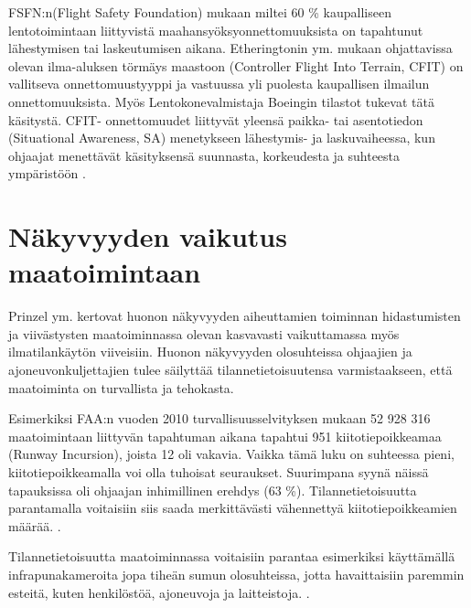 \documentclass[utf8,bachelor,manualbib]{gradu3}
\begin{document}
FSFN:n(Flight Safety Foundation) mukaan miltei 60 \% kaupalliseen lentotoimintaan liittyvistä maahansyöksyonnettomuuksista on tapahtunut lähestymisen tai laskeutumisen aikana. Etheringtonin ym. \citeyearpar{etherington2000} mukaan ohjattavissa olevan ilma-aluksen törmäys maastoon (Controller Flight Into Terrain, CFIT) on vallitseva onnettomuustyyppi ja vastuussa yli puolesta kaupallisen ilmailun onnettomuuksista. Myös Lentokonevalmistaja Boeingin \citeyearpar{boeing1996} tilastot tukevat tätä käsitystä. CFIT- onnettomuudet liittyvät yleensä paikka- tai asentotiedon (Situational Awareness, SA) menetykseen lähestymis- ja laskuvaiheessa, kun ohjaajat menettävät käsityksensä suunnasta, korkeudesta ja suhteesta ympäristöön \cite{schnell2004}.

\section{Näkyvyyden vaikutus maatoimintaan}

Prinzel ym. \citeyearpar{prinzel2013} kertovat huonon näkyvyyden aiheuttamien toiminnan hidastumisten ja viivästysten maatoiminnassa olevan kasvavasti vaikuttamassa myös ilmatilankäytön viiveisiin. Huonon näkyvyyden olosuhteissa ohjaajien ja ajoneuvonkuljettajien tulee säilyttää tilannetietoisuutensa varmistaakseen, että maatoiminta on turvallista ja tehokasta.

Esimerkiksi FAA:n vuoden 2010 turvallisuusselvityksen mukaan 52 928 316 maatoimintaan liittyvän tapahtuman aikana tapahtui 951 kiitotiepoikkeamaa (Runway Incursion), joista 12 oli vakavia. Vaikka tämä luku on suhteessa pieni, kiitotiepoikkeamalla voi olla tuhoisat seuraukset. Suurimpana syynä näissä tapauksissa oli ohjaajan inhimillinen erehdys (63 \%). Tilannetietoisuutta parantamalla voitaisiin siis saada merkittävästi vähennettyä kiitotiepoikkeamien määrää. \citep{prinzel2013}.

Tilannetietoisuutta maatoiminnassa voitaisiin parantaa esimerkiksi käyttämällä infrapunakameroita jopa tiheän sumun olosuhteissa, jotta havaittaisiin paremmin esteitä, kuten henkilöstöä, ajoneuvoja ja laitteistoja. \citep{beiergemperlein2004}.
\end{document}
